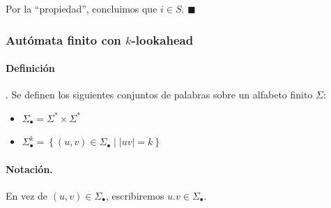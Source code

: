 Por la ``propiedad'', concluimos que $i \in S$. \hfill $\blacksquare$

\subsubsection[Autómata finito con k-lookahead]{Autómata finito con $k$-lookahead}

\paragraph{Definición}. Se definen los siguientes conjuntos de palabras sobre un alfabeto finito $\Sigma$:
\begin{itemize}
    \item $\Sigma_{\bullet}=\Sigma^* \times \Sigma^*$
    \item $\Sigma_{\bullet}^k=\left\{(u, v) \in \Sigma_{\bullet}\mid |uv| = k\right\}$
\end{itemize}

\paragraph{Notación.} En vez de $(u,v) \in \Sigma_\bullet$, escribiremos $u.v \in \Sigma_\bullet$.


